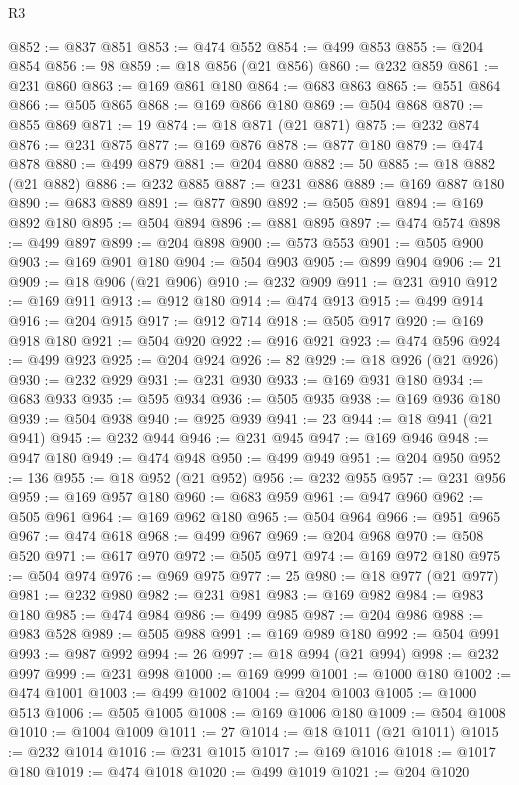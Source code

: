 \begin{lexlean}{R3}
\begin{coremodule}
@852 := @837 @851
@853 := @474 @552
@854 := @499 @853
@855 := @204 @854
@856 := 98
@859 := @18 @856 (@21 @856)
@860 := @232 @859
@861 := @231 @860
@863 := @169 @861 @180
@864 := @683 @863
@865 := @551 @864
@866 := @505 @865
@868 := @169 @866 @180
@869 := @504 @868
@870 := @855 @869
@871 := 19
@874 := @18 @871 (@21 @871)
@875 := @232 @874
@876 := @231 @875
@877 := @169 @876
@878 := @877 @180
@879 := @474 @878
@880 := @499 @879
@881 := @204 @880
@882 := 50
@885 := @18 @882 (@21 @882)
@886 := @232 @885
@887 := @231 @886
@889 := @169 @887 @180
@890 := @683 @889
@891 := @877 @890
@892 := @505 @891
@894 := @169 @892 @180
@895 := @504 @894
@896 := @881 @895
@897 := @474 @574
@898 := @499 @897
@899 := @204 @898
@900 := @573 @553
@901 := @505 @900
@903 := @169 @901 @180
@904 := @504 @903
@905 := @899 @904
@906 := 21
@909 := @18 @906 (@21 @906)
@910 := @232 @909
@911 := @231 @910
@912 := @169 @911
@913 := @912 @180
@914 := @474 @913
@915 := @499 @914
@916 := @204 @915
@917 := @912 @714
@918 := @505 @917
@920 := @169 @918 @180
@921 := @504 @920
@922 := @916 @921
@923 := @474 @596
@924 := @499 @923
@925 := @204 @924
@926 := 82
@929 := @18 @926 (@21 @926)
@930 := @232 @929
@931 := @231 @930
@933 := @169 @931 @180
@934 := @683 @933
@935 := @595 @934
@936 := @505 @935
@938 := @169 @936 @180
@939 := @504 @938
@940 := @925 @939
@941 := 23
@944 := @18 @941 (@21 @941)
@945 := @232 @944
@946 := @231 @945
@947 := @169 @946
@948 := @947 @180
@949 := @474 @948
@950 := @499 @949
@951 := @204 @950
@952 := 136
@955 := @18 @952 (@21 @952)
@956 := @232 @955
@957 := @231 @956
@959 := @169 @957 @180
@960 := @683 @959
@961 := @947 @960
@962 := @505 @961
@964 := @169 @962 @180
@965 := @504 @964
@966 := @951 @965
@967 := @474 @618
@968 := @499 @967
@969 := @204 @968
@970 := @508 @520
@971 := @617 @970
@972 := @505 @971
@974 := @169 @972 @180
@975 := @504 @974
@976 := @969 @975
@977 := 25
@980 := @18 @977 (@21 @977)
@981 := @232 @980
@982 := @231 @981
@983 := @169 @982
@984 := @983 @180
@985 := @474 @984
@986 := @499 @985
@987 := @204 @986
@988 := @983 @528
@989 := @505 @988
@991 := @169 @989 @180
@992 := @504 @991
@993 := @987 @992
@994 := 26
@997 := @18 @994 (@21 @994)
@998 := @232 @997
@999 := @231 @998
@1000 := @169 @999
@1001 := @1000 @180
@1002 := @474 @1001
@1003 := @499 @1002
@1004 := @204 @1003
@1005 := @1000 @513
@1006 := @505 @1005
@1008 := @169 @1006 @180
@1009 := @504 @1008
@1010 := @1004 @1009
@1011 := 27
@1014 := @18 @1011 (@21 @1011)
@1015 := @232 @1014
@1016 := @231 @1015
@1017 := @169 @1016
@1018 := @1017 @180
@1019 := @474 @1018
@1020 := @499 @1019
@1021 := @204 @1020

\end{coremodule}
\end{lexlean}
